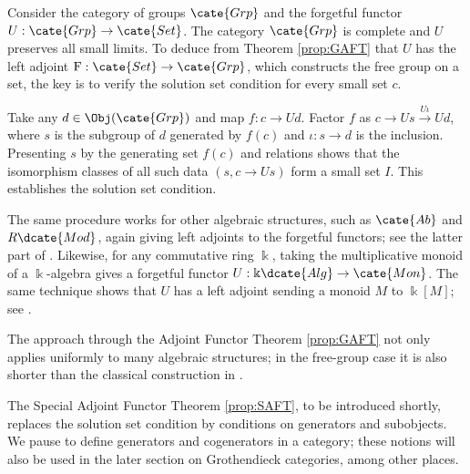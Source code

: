 \begin{example}\label{eg:free-group-GAFT}
	Consider the category of groups $\cate{Grp}$ and the forgetful functor
	$U:\cate{Grp}\to\cate{Set}$. The category $\cate{Grp}$ is complete and
	$U$ preserves all small limits. To deduce from Theorem \ref{prop:GAFT}
	that $U$ has the left adjoint $\mathrm{F}:\cate{Set}\to\cate{Grp}$, which
	constructs the free group on a set, the key is to verify the solution set
	condition for every small set $c$.

	Take any $d\in\Obj(\cate{Grp})$ and map $f:c\to Ud$. Factor $f$ as
	$c\to Us\xrightarrow{U\iota}Ud$, where $s$ is the subgroup of $d$
	generated by $f(c)$ and $\iota:s\to d$ is the inclusion. Presenting $s$ by
	the generating set $f(c)$ and relations shows that the isomorphism classes
	of all such data $(s,c\to Us)$ form a small set $I$. This establishes the
	solution set condition.

	The same procedure works for other algebraic structures, such as
	$\cate{Ab}$ and $R\dcate{Mod}$, again giving left adjoints to the forgetful
	functors; see the latter part of \cite[Chapter V, \S 6]{ML98}. Likewise,
	for any commutative ring $\Bbbk$, taking the multiplicative monoid of a
	$\Bbbk$-algebra gives a forgetful functor
	$U:\Bbbk\dcate{Alg}\to\cate{Mon}$. The same technique shows that $U$ has
	a left adjoint sending a monoid $M$ to $\Bbbk[M]$; see
	\cite[Definition 5.6.1]{Li1}.

	The approach through the Adjoint Functor Theorem \ref{prop:GAFT} not only
	applies uniformly to many algebraic structures; in the free-group case it
	is also shorter than the classical construction in \cite[\S 4.8]{Li1}.
\end{example}

The Special Adjoint Functor Theorem \ref{prop:SAFT}, to be introduced shortly,
replaces the solution set condition by conditions on generators and
subobjects. We pause to define generators and cogenerators in a category;
these notions will also be used in the later section on Grothendieck
categories, among other places.

